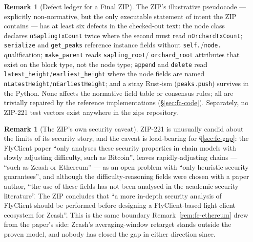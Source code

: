 \documentclass[11pt,a4paper]{article}
\theoremstyle{definition}
\newtheorem{remark}[theorem]{Remark}
\begin{document}
\begin{remark}[Defect ledger for a Final ZIP]\label{rem:fc-zip-defects}
The ZIP's illustrative pseudocode --- explicitly non-normative, but the
only executable statement of intent the ZIP contains --- has at least six
defects in the checked-out text: the node class declares
\texttt{nSaplingTxCount} twice where the second must read
\texttt{nOrchardTxCount}; \texttt{serialize} and \texttt{get\_peaks}
reference instance fields without \texttt{self.}/\texttt{node.}
qualification; \texttt{make\_parent} reads \texttt{sapling\_root}/%
\texttt{orchard\_root} attributes that exist on the block type, not the
node type; \texttt{append} and \texttt{delete} read
\texttt{latest\_height}/\texttt{earliest\_height} where the node fields are
named \texttt{nLatestHeight}/\texttt{nEarliestHeight}; and a stray
Rust-ism (\texttt{peaks.push}) survives in the Python. None affects the
normative field table or consensus rules; all
are trivially repaired by the reference implementations
(\S\ref{sec:fc-code}). Separately, no ZIP-221 test vectors exist
anywhere in the \textsf{zips} repository.
\end{remark}

\begin{remark}[The ZIP's own security caveat]\label{rem:fc-zip-caveat}
ZIP-221 is unusually candid about the limits of its security story, and
the caveat is load-bearing for \S\ref{sec:fc-gap}: the FlyClient paper
``only analyses these security properties in chain models with slowly
adjusting difficulty, such as Bitcoin'', leaves rapidly-adjusting chains
--- ``such as Zcash or Ethereum'' --- as an open problem with
``only heuristic security guarantees'', and although the
difficulty-reasoning fields were chosen with a paper author, ``the use
of these fields has not been analysed in the academic security
literature''. The ZIP concludes that ``a more in-depth security
analysis of FlyClient should be performed before designing a
FlyClient-based light client ecosystem for Zcash''. This is the same
boundary Remark~\ref{rem:fc-ethereum} drew from the paper's side:
Zcash's averaging-window retarget stands outside the proven model, and
nobody has closed the gap in either direction since.
\end{remark}

\end{document}
